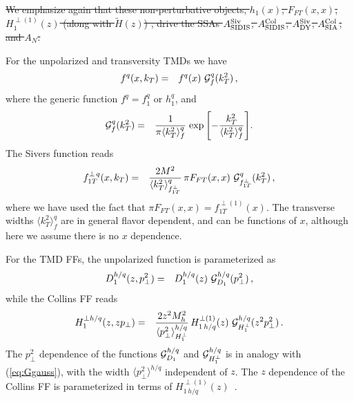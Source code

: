 \documentclass[twocolumn,prl,aps,superscriptaddress
               ,footinbib,amsfonts,amsmath,amssymb,showpacs]{revtex4-1}
\def\kT{k_T}
\def\pperp{p_\perp}
\def\avkT{\la \kT^2 \ra}
\def\avpperp{\la \pperp^2 \ra}
\newcommand{\la}{\langle}
\newcommand{\ra}{\rangle}
\newcommand{\old}[1]{{\color{red}\sout{#1}}}
\begin{document}
\old{We emphasize again that these
non-perturbative objects, 
    $h_1(x)$, 
    $F_{FT}(x,x)$, 
    $H_1^{\perp(1)}(z)$
    (along with $\tilde{H}(z)$)
, drive the SSAs 
    $A_{\rm SIDIS}^{\rm Siv}$,
    $A_{\rm SIDIS}^{\rm Col}$, 
    $A_{\rm DY}^{\rm Siv}$, 
    $A_{\rm SIA}^{\rm Col}$, and 
    $A_N$.}

%
For the unpolarized and transversity TMDs we have
%
\begin{eqnarray}
f^q(x,k_T) 
&=& f^q(x)\ {\cal G}_{f}^q(k_T^2)\,,
\label{eq:f1h1-gauss}
\end{eqnarray}
%
where the generic function $f^q = f_1^q$ or $h_1^q$, and
%
\begin{eqnarray}
{\cal G}_f^q(k_T^2)
&=& \frac{1}{\pi\avkT_f^q}\;
{\exp\left[{-\frac{\kT^2}{\avkT_f^q}}\right]}.
\label{eq:Ggauss}
\end{eqnarray}
%
The Sivers function reads
%
\begin{eqnarray}
f_{1T}^{\perp \,q}(x,k_T)
&=& \frac{2 M^2}{\avkT^{q}_{f_{1T}^\perp}}\,
    \pi F_{FT}(x,x)\
    {\cal G}_{f_{1T}^\perp}^{q}(k_T^2)\,,
\label{e:sivers}
\end{eqnarray}
%
where we have used the fact that 
$\pi F_{FT}(x,x)=f_{1T}^{\perp(1)}(x)$. 
%
The transverse widths $\avkT_{f}^q$ are in general flavor dependent,
and can be functions of $x$, although here we assume there is no $x$
dependence.

For the TMD FFs, the unpolarized function is parameterized as
%
\begin{eqnarray}
D_1^{h/q}(z,\pperp^2)
&=& D_1^{h/q}(z)\ {\cal G}_{D_1}^{h/q}(\pperp^2)\,,
\end{eqnarray}
%
while the Collins FF reads
%
\begin{eqnarray}
H_1^{\perp h/q}(z,z\pperp)
&=& \frac{2 z^2 M_h^2}{\avpperp^{h/q}_{H_1^\perp}}\,
    H_{1\, h/q}^{\perp (1)}(z)\
    {\cal G}_{H_1^\perp}^{h/q}(z^2\pperp^2)\,.
\label{e:collins}
\end{eqnarray}
%
The $\pperp^2$ dependence of the functions
	${\cal G}_{D_1}^{h/q}$ and
	${\cal G}_{H_1^\perp}^{h/q}$
is in analogy with (\ref{eq:Ggauss}),
with the width $\avpperp^{h/q}$ independent of $z$.
%
The $z$ dependence of the Collins FF is parameterized in terms
of $H_{1\, h/q}^{\perp (1)}(z)$~\cite{Kang:2015msa}.  
\end{document}
